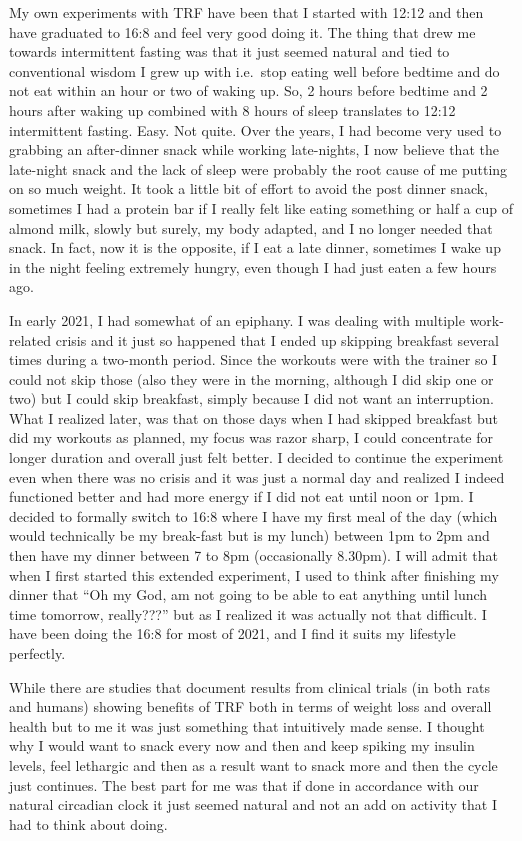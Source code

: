 \documentclass[
  oneside]{book}
\begin{document}
My own experiments with TRF have been that I started with 12:12 and then have graduated to 16:8 and feel very good doing it. The thing that drew me towards intermittent fasting was that it just seemed natural and tied to conventional wisdom I grew up with i.e.~stop eating well before bedtime and do not eat within an hour or two of waking up. So, 2 hours before bedtime and 2 hours after waking up combined with 8 hours of sleep translates to 12:12 intermittent fasting. Easy. Not quite. Over the years, I had become very used to grabbing an after-dinner snack while working late-nights, I now believe that the late-night snack and the lack of sleep were probably the root cause of me putting on so much weight. It took a little bit of effort to avoid the post dinner snack, sometimes I had a protein bar if I really felt like eating something or half a cup of almond milk, slowly but surely, my body adapted, and I no longer needed that snack. In fact, now it is the opposite, if I eat a late dinner, sometimes I wake up in the night feeling extremely hungry, even though I had just eaten a few hours ago.

In early 2021, I had somewhat of an epiphany. I was dealing with multiple work-related crisis and it just so happened that I ended up skipping breakfast several times during a two-month period. Since the workouts were with the trainer so I could not skip those (also they were in the morning, although I did skip one or two) but I could skip breakfast, simply because I did not want an interruption. What I realized later, was that on those days when I had skipped breakfast but did my workouts as planned, my focus was razor sharp, I could concentrate for longer duration and overall just felt better. I decided to continue the experiment even when there was no crisis and it was just a normal day and realized I indeed functioned better and had more energy if I did not eat until noon or 1pm. I decided to formally switch to 16:8 where I have my first meal of the day (which would technically be my break-fast but is my lunch) between 1pm to 2pm and then have my dinner between 7 to 8pm (occasionally 8.30pm). I will admit that when I first started this extended experiment, I used to think after finishing my dinner that ``Oh my God, am not going to be able to eat anything until lunch time tomorrow, really???'' but as I realized it was actually not that difficult. I have been doing the 16:8 for most of 2021, and I find it suits my lifestyle perfectly.

While there are studies that document results from clinical trials (in both rats and humans) showing benefits of TRF both in terms of weight loss and overall health but to me it was just something that intuitively made sense. I thought why I would want to snack every now and then and keep spiking my insulin levels, feel lethargic and then as a result want to snack more and then the cycle just continues. The best part for me was that if done in accordance with our natural circadian clock it just seemed natural and not an add on activity that I had to think about doing.
\end{document}
